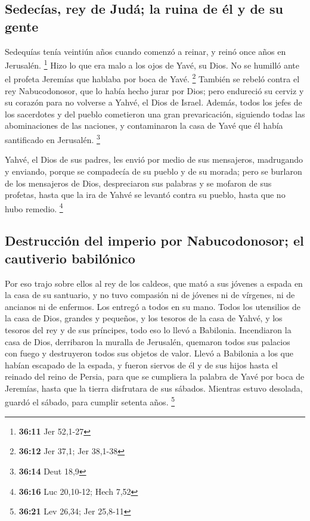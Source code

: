 \begin{paracol}{2}
\hypertarget{sedecuxedas-rey-de-juduxe1-la-ruina-de-uxe9l-y-de-su-gente}{%
\subsection{Sedecías, rey de Judá; la ruina de él y de su
gente}\label{sedecuxedas-rey-de-juduxe1-la-ruina-de-uxe9l-y-de-su-gente}}

 Sedequías tenía veintiún años cuando comenzó a reinar, y
reinó once años en Jerusalén. \footnote{\textbf{36:11} Jer 52,1-27}
 Hizo lo que era malo a los ojos de Yavé, su Dios. No se
humilló ante el profeta Jeremías que hablaba por boca de Yavé.
\footnote{\textbf{36:12} Jer 37,1; Jer 38,1-38}  También
se rebeló contra el rey Nabucodonosor, que lo había hecho jurar por
Dios; pero endureció su cerviz y su corazón para no volverse a Yahvé, el
Dios de Israel.  Además, todos los jefes de los
sacerdotes y del pueblo cometieron una gran prevaricación, siguiendo
todas las abominaciones de las naciones, y contaminaron la casa de Yavé
que él había santificado en Jerusalén. \footnote{\textbf{36:14} Deut
  18,9}

 Yahvé, el Dios de sus padres, les envió por medio de sus
mensajeros, madrugando y enviando, porque se compadecía de su pueblo y
de su morada;  pero se burlaron de los mensajeros de
Dios, despreciaron sus palabras y se mofaron de sus profetas, hasta que
la ira de Yahvé se levantó contra su pueblo, hasta que no hubo remedio.
\footnote{\textbf{36:16} Luc 20,10-12; Hech 7,52}

\hypertarget{destrucciuxf3n-del-imperio-por-nabucodonosor-el-cautiverio-babiluxf3nico}{%
\subsection{Destrucción del imperio por Nabucodonosor; el cautiverio
babilónico}\label{destrucciuxf3n-del-imperio-por-nabucodonosor-el-cautiverio-babiluxf3nico}}

 Por eso trajo sobre ellos al rey de los caldeos, que
mató a sus jóvenes a espada en la casa de su santuario, y no tuvo
compasión ni de jóvenes ni de vírgenes, ni de ancianos ni de enfermos.
Los entregó a todos en su mano.  Todos los utensilios de
la casa de Dios, grandes y pequeños, y los tesoros de la casa de Yahvé,
y los tesoros del rey y de sus príncipes, todo eso lo llevó a Babilonia.
 Incendiaron la casa de Dios, derribaron la muralla de
Jerusalén, quemaron todos sus palacios con fuego y destruyeron todos sus
objetos de valor.  Llevó a Babilonia a los que habían
escapado de la espada, y fueron siervos de él y de sus hijos hasta el
reinado del reino de Persia,  para que se cumpliera la
palabra de Yavé por boca de Jeremías, hasta que la tierra disfrutara de
sus sábados. Mientras estuvo desolada, guardó el sábado, para cumplir
setenta años. \footnote{\textbf{36:21} Lev 26,34; Jer 25,8-11}


\end{paracol}
